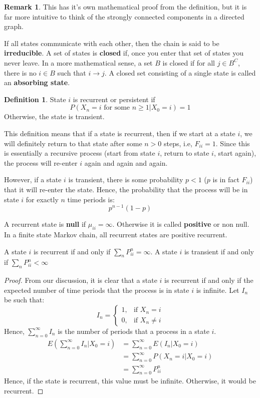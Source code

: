 \documentclass[12pt,letterpaper]{book}
\theoremstyle{definition}
\newtheorem{definition}{Definition}%
\newtheorem*{remark}{Remark}
\begin{document}
\begin{remark}
  This has it's own mathematical proof from the definition, but it is far more intuitive to think of the strongly connected components in a directed graph.  
\end{remark}

If all states communicate with each other, then the chain is said to be \textbf{irreducible}. A set of states is \textbf{closed} if, once you enter that set of states you never leave. In a more mathematical sense, a set $B$ is closed if for all $j \in B^C$, there is no $i \in B$ such that $i \rightarrow j$. A closed set consisting of a single state is called an \textbf{absorbing state}.   

\begin{definition}
  State $i$ is recurrent or persistent if 
  \[P(X_n=i \text{ for some } n \geq 1 | X_0 = i)  = 1\]
  Otherwise, the state is transient.
\end{definition}

This definition means that if a state is recurrent, then if we start at a state $i$, we will definitely return to that state after some $n > 0$ steps, i.e, $F_{ii} = 1$. Since this is essentially a recursive process (start from state $i$, return to state $i$, start again), the process will re-enter $i$ again and again and again. 

However, if a state $i$ is transient, there is some probability $p < 1$ ($p$ is in fact $F_{ii}$) that it will re-enter the state. Hence, the probability that the process will be in state $i$ for exactly $n$ time periods is:
\[p^{n-1} (1-p)\]

A recurrent state is \textbf{null} if $\mu_{ii} = \infty$. Otherwise it is called \textbf{positive} or non null. In a finite state Markov chain, all recurrent states are positive recurrent.

\begin{theorem}
  A state $i$ is recurrent if and only if $\sum_n P_{ii}^n = \infty$. A state $i$ is transient if and only if $\sum_n P_{ii}^n < \infty$  
\end{theorem}
\begin{proof}
  From our discussion, it is clear that a state $i$ is recurrent if and only if the expected number of time periods that the process is in state $i$ is infinite. Let $I_n$ be such that:
  \[I_n = \begin{cases}
    1, & \text{if } X_n = i \\
    0, & \text{if } X_n \neq i
  \end{cases}\]
  Hence, $\sum_{n=0}^{\infty} I_n$ is the number of periods that a process in a state $i$.
  \begin{align*}
    E \left( \sum_{n=0}^{\infty} I_n | X_0 = i\right) &= \sum_{n=0}^{\infty} E(I_n | X_0 = i) \\
                                                      &= \sum_{n=0}^{\infty} P(X_n = i | X_0 = i) \\
                                                      &= \sum_{n=0}^{\infty} P_{ii}^n
  \end{align*}
  Hence, if the state is recurrent, this value must be infinite. Otherwise, it would be recurrent.
\end{proof}
\end{document}
